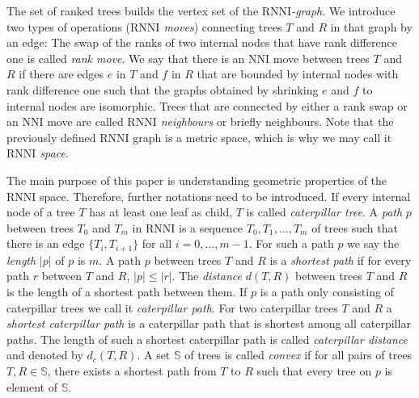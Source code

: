 \documentclass[11pt, a4paper]{article}
\newcommand{\nni}{\mathrm{NNI}}
\newcommand{\rnni}{\mathrm{RNNI}}
\begin{document}
The set of ranked trees builds the vertex set of the \emph{$\rnni$-graph}.
We introduce two types of operations (\emph{$\rnni$ moves}) connecting trees $T$ and $R$ in that graph by an edge:
The swap of the ranks of two internal nodes that have rank difference one is called \emph{rank move}.
We say that there is an $\nni$ move between trees $T$ and $R$ if there are edges $e$ in $T$ and $f$ in $R$ that are bounded by internal nodes with rank difference one such that the graphs obtained by shrinking $e$ and $f$ to internal nodes are isomorphic.
Trees that are connected by either a rank swap or an $\nni$ move are called \emph{$\rnni$ neighbours} or briefly neighbours.
Note that the previously defined $\rnni$ graph is a metric space, which is why we may call it \emph{$\rnni$ space}.

\todo{figure: rank + $\nni$ move}

The main purpose of this paper is understanding geometric properties of the $\rnni$ space.
Therefore, further notations need to be introduced.
If every internal node of a tree $T$ has at least one leaf as child, $T$ is called \emph{caterpillar tree}.
A \emph{path} $p$ between trees $T_0$ and $T_m$ in $\rnni$ is a sequence $T_0, T_1, \ldots, T_m$ of trees such that there is an edge $\{T_i, T_{i+1}\}$ for all $i=0,\ldots,m-1$.
For such a path $p$ we say the \emph{length} $|p|$ of $p$ is $m$.
A path $p$ between trees $T$ and $R$ is a \emph{shortest path} if for every path $r$ between $T$ and $R$, $|p| \leq |r|$.
The \emph{distance} $d(T,R)$ between trees $T$ and $R$ is the length of a shortest path between them.
If $p$ is a path only consisting of caterpillar trees we call it \emph{caterpillar path}.
For two caterpillar trees $T$ and $R$ a \emph{shortest caterpillar path} is a caterpillar path that is shortest among all caterpillar paths.
The length of such a shortest caterpillar path is called \emph{caterpillar distance} and denoted by $d_c(T,R)$.
A set $\mathbb S$ of trees is called \emph{convex} if for all pairs of trees $T,R \in \mathbb S$, there exists a shortest path from $T$ to $R$ such that every tree on $p$ is element of $\mathbb S$.




\end{document}
